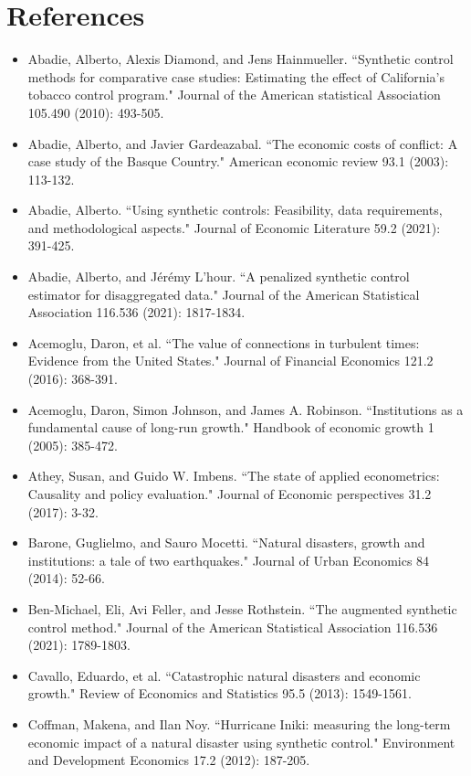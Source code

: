 \documentclass[12pt,a4paper,draft]{article}
\begin{document}
\section{References}
\begin{itemize}
    \item Abadie, Alberto, Alexis Diamond, and Jens Hainmueller. ``Synthetic control methods for comparative case studies: Estimating the effect of California's tobacco control program." Journal of the American statistical Association 105.490 (2010): 493-505.
    \item Abadie, Alberto, and Javier Gardeazabal. ``The economic costs of conflict: A case study of the Basque Country." American economic review 93.1 (2003): 113-132.
    \item Abadie, Alberto. ``Using synthetic controls: Feasibility, data requirements, and methodological aspects." Journal of Economic Literature 59.2 (2021): 391-425.
    \item Abadie, Alberto, and Jérémy L'hour. ``A penalized synthetic control estimator for disaggregated data." Journal of the American Statistical Association 116.536 (2021): 1817-1834.
    \item Acemoglu, Daron, et al. ``The value of connections in turbulent times: Evidence from the United States." Journal of Financial Economics 121.2 (2016): 368-391.
    \item Acemoglu, Daron, Simon Johnson, and James A. Robinson. ``Institutions as a fundamental cause of long-run growth." Handbook of economic growth 1 (2005): 385-472.
    \item Athey, Susan, and Guido W. Imbens. ``The state of applied econometrics: Causality and policy evaluation." Journal of Economic perspectives 31.2 (2017): 3-32.
    \item Barone, Guglielmo, and Sauro Mocetti. ``Natural disasters, growth and institutions: a tale of two earthquakes." Journal of Urban Economics 84 (2014): 52-66.
    \item Ben-Michael, Eli, Avi Feller, and Jesse Rothstein. ``The augmented synthetic control method." Journal of the American Statistical Association 116.536 (2021): 1789-1803.
    \item Cavallo, Eduardo, et al. ``Catastrophic natural disasters and economic growth." Review of Economics and Statistics 95.5 (2013): 1549-1561.
    \item Coffman, Makena, and Ilan Noy. ``Hurricane Iniki: measuring the long-term economic impact of a natural disaster using synthetic control." Environment and Development Economics 17.2 (2012): 187-205.

\end{itemize}
\end{document}
